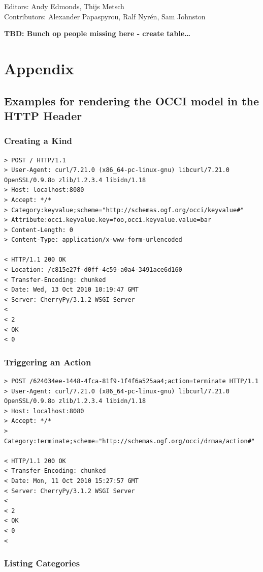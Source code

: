 \documentclass[10pt,a4paper]{article}
\begin{document}
Editors: Andy Edmonds, Thijs Metsch \\
Contributors: Alexander Papaspyrou, Ralf Nyrén, Sam Johnston

\textbf{TBD: Bunch op people missing here - create table\ldots}

\section{Appendix}

\subsection{Examples for rendering the OCCI model in the HTTP Header}

\subsubsection{Creating a Kind}
\begin{verbatim}
> POST / HTTP/1.1
> User-Agent: curl/7.21.0 (x86_64-pc-linux-gnu) libcurl/7.21.0 OpenSSL/0.9.8o zlib/1.2.3.4 libidn/1.18
> Host: localhost:8080
> Accept: */*
> Category:keyvalue;scheme="http://schemas.ogf.org/occi/keyvalue#"
> Attribute:occi.keyvalue.key=foo,occi.keyvalue.value=bar
> Content-Length: 0
> Content-Type: application/x-www-form-urlencoded

< HTTP/1.1 200 OK
< Location: /c815e27f-d0ff-4c59-a0a4-3491ace6d160
< Transfer-Encoding: chunked
< Date: Wed, 13 Oct 2010 10:19:47 GMT
< Server: CherryPy/3.1.2 WSGI Server
< 
< 2
< OK
< 0
\end{verbatim}

\subsubsection{Triggering an Action}

\begin{verbatim}
> POST /624034ee-1448-4fca-81f9-1f4f6a525aa4;action=terminate HTTP/1.1
> User-Agent: curl/7.21.0 (x86_64-pc-linux-gnu) libcurl/7.21.0 OpenSSL/0.9.8o zlib/1.2.3.4 libidn/1.18
> Host: localhost:8080
> Accept: */*
> Category:terminate;scheme="http://schemas.ogf.org/occi/drmaa/action#"

< HTTP/1.1 200 OK
< Transfer-Encoding: chunked
< Date: Mon, 11 Oct 2010 15:27:57 GMT
< Server: CherryPy/3.1.2 WSGI Server
< 
< 2
< OK
< 0
<
\end{verbatim}

\subsubsection{Listing Categories}
\end{document}
